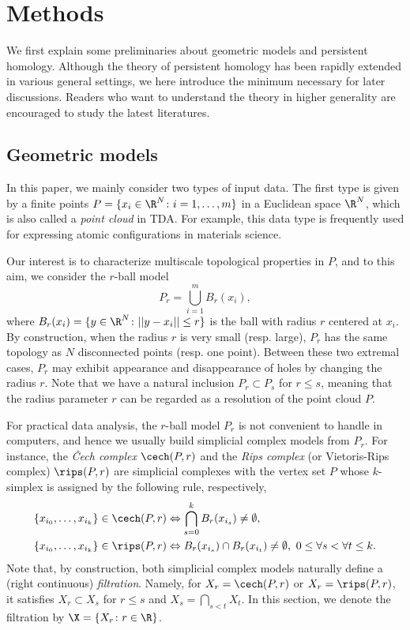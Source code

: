 \documentclass[smallextended]{svjour3}
\begin{document}
  
  
  
\section{Methods}\label{sec:method}
We first explain some preliminaries about geometric models and persistent homology. Although the theory of persistent homology has been rapidly extended in various general settings, we here introduce the minimum necessary for later discussions. Readers who want to understand the theory in higher generality are encouraged to study the latest literatures. 

\subsection{Geometric models}\label{sec:geometric_model}
In this paper, we mainly consider two types of input data. The first type is given by a finite points $P=\{x_i\in\R^N\colon i=1,\dots,m\}$ in a Euclidean space $\R^N$, which is also called a \emph{point cloud} in TDA. For example, this data type is frequently used for expressing atomic configurations in materials science. 

Our interest is to characterize multiscale topological properties in $P$, and to this aim, we consider the $r$-ball model
\[
	P_r=\bigcup_{i=1}^mB_r(x_i),
\]
where $B_r(x_i)=\{y\in\R^N\colon ||y-x_i||\leq r\}$ is the ball with radius $r$ centered at $x_i$. By construction, when the radius $r$ is very small (resp. large), $P_r$ has the same topology as $N$ disconnected points (resp. one point). Between these two extremal cases, $P_r$ may exhibit appearance and disappearance of holes by changing the radius $r$. Note that we have a natural inclusion $P_r\subset P_s$ for $r\leq s$, meaning that the radius parameter $r$ can be regarded as a resolution of the point cloud $P$. 

For practical data analysis, the $r$-ball model $P_r$ is not convenient to handle in computers, and hence we usually build  simplicial complex models from $P_r$. For instance, the \emph{{\v C}ech complex} $\cech(P,r)$ and the \emph{Rips complex} (or Vietoris-Rips complex) $\rips(P,r)$ are simplicial complexes with the vertex set $P$ whose $k$-simplex is assigned by the following rule, respectively,
\begin{align*}
&\{x_{i_0},\dots,x_{i_k}\}\in \cech(P,r)\Leftrightarrow \bigcap_{s=0}^kB_r(x_{i_s})\neq \emptyset,\\
&\{x_{i_0},\dots,x_{i_k}\}\in \rips(P,r)\Leftrightarrow B_r(x_{i_s})\cap B_r(x_{i_t})\neq\emptyset,~0\leq \forall s<\forall t\leq k.
\end{align*}
Note that, by construction, both simplicial complex models naturally define a (right continuous) \emph{filtration}. Namely, for $X_r=\cech(P,r)$ or $X_r=\rips(P,r)$, it satisfies $X_r\subset X_s$ for $r\leq s$ and $X_s=\bigcap_{s<t}X_t$. In this section, we denote the filtration by $\X=\{X_r\colon r\in\R\}$. 
\end{document}
